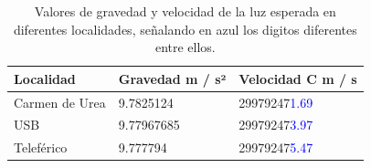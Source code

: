 \begin{table}[h]
\centering
\begin{tabular}{|l|l|l|}
\hline
Localidad & Gravedad m / s² & Velocidad C m / s \\
\hline
Carmen de Urea & 9.7825124 & 29979247\textcolor{blue}{1.69} \\
\hline
USB & 9.77967685 & 29979247\textcolor{blue}{3.97} \\
\hline
Teleférico & 9.777794 & 29979247\textcolor{blue}{5.47} \\
\hline
\end{tabular}
\caption{Valores de gravedad y velocidad de la luz esperada en diferentes localidades, señalando en azul los digitos diferentes entre ellos.}
\label{tab:Valores_c_esperados}
\end{table}


